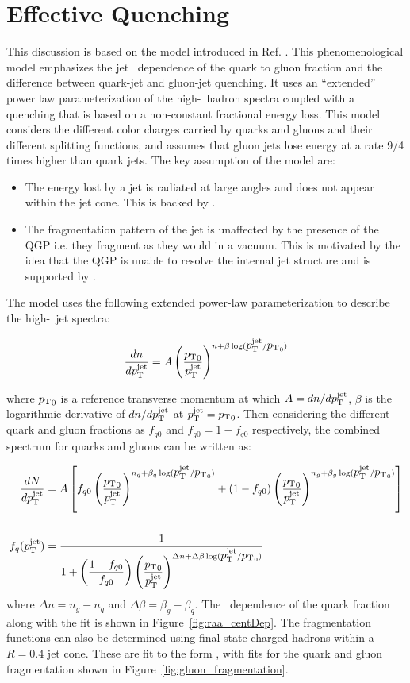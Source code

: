 \section{Effective Quenching}
This discussion is based on the model introduced in Ref. \cite{Spousta:2015fca}. This phenomenological model emphasizes the jet \pt\ dependence of the quark to gluon fraction and the difference between quark-jet and gluon-jet quenching. It uses an ``extended'' power law parameterization of the high-\pt\ hadron spectra coupled with a quenching that is based on a non-constant fractional energy loss. This model considers the different color charges carried by quarks and gluons and their different splitting functions, and assumes that gluon jets lose energy at a rate 9/4 times higher than quark jets. The key assumption of the model are:
\begin{itemize}
\item The energy lost by a jet is radiated at large angles and does not appear within the jet cone. This is backed by \cite{Chatrchyan:2011sx}.
\item The fragmentation pattern of the jet is unaffected by the presence of the QGP i.e. they fragment as they would in a vacuum. This is motivated by the idea that the QGP is unable to resolve the internal jet structure and is supported by \cite{Blaizot:2013hx, CasalderreySolana:2012ef}.
\end{itemize} 

The model uses the following extended power-law parameterization to describe the high-\pt\ jet spectra:

\begin{align}
\frac{dn}{d\mbox{$p_{\mathrm{T}}^{\mathrm{jet}}$}} = A \left( \frac{\mbox{$p_{\mathrm{T}}$}_0}{\mbox{$p_{\mathrm{T}}^{\mathrm{jet}}$}} \right) ^{n+\beta \log(\mbox{$p_{\mathrm{T}}^{\mathrm{jet}}$} / \mbox{$p_{\mathrm{T}}$}_0)}
\end{align}

where $\mbox{$p_{\mathrm{T}}$}_0$ is a reference transverse momentum at which $A= dn/d\mbox{$p_{\mathrm{T}}^{\mathrm{jet}}$}$, $\beta$ is the logarithmic derivative of $dn/d\mbox{$p_{\mathrm{T}}^{\mathrm{jet}}$}$ at $\mbox{$p_{\mathrm{T}}^{\mathrm{jet}}$} = \mbox{$p_{\mathrm{T}}$}_0$. Then considering the different quark and gluon fractions as $f_{q0}$ and $f_{g0} = 1-f_{q0}$ respectively, the combined spectrum for quarks and gluons can be written as:

\begin{align}
 \frac{dN}{d\mbox{$p_{\mathrm{T}}^{\mathrm{jet}}$}} &= A \left[ f_{q0} \left( \frac{\mbox{$p_{\mathrm{T}}$}_0}{\mbox{$p_{\mathrm{T}}^{\mathrm{jet}}$}} \right)^{n_q+ \beta_q \log(\mbox{$p_{\mathrm{T}}^{\mathrm{jet}}$} / \mbox{$p_{\mathrm{T}}$}_0)} + (1-f_{q0}) \left( \frac{\mbox{$p_{\mathrm{T}}$}_0}{\mbox{$p_{\mathrm{T}}^{\mathrm{jet}}$}} \right)^{n_g + \beta_g \log(\mbox{$p_{\mathrm{T}}^{\mathrm{jet}}$} / \mbox{$p_{\mathrm{T}}$}_0)} \right] \\
\nonumber \\ 
\label{eq:eq_q_frac} f_q (\mbox{$p_{\mathrm{T}}^{\mathrm{jet}}$}) &= \dfrac{1}{1 + \left(\dfrac{1-f_{q0}}{f_{q0}}\right) \left( \dfrac{\mbox{$p_{\mathrm{T}}$}_0}{\mbox{$p_{\mathrm{T}}^{\mathrm{jet}}$}}\right)^{\Delta n + \Delta \beta \log(\mbox{$p_{\mathrm{T}}^{\mathrm{jet}}$}/\mbox{$p_{\mathrm{T}}$}_0)} }
\end{align}
where $\Delta n = n_g - n_q$ and $\Delta \beta = \beta_g - \beta_q$. The \pt\ dependence of the quark fraction along with the fit is shown in Figure~\ref{fig:raa_centDep}. The fragmentation functions can also be determined using final-state charged hadrons within a $R=0.4$ jet cone. These are fit to the form \Dz, with fits for the quark and gluon fragmentation shown in Figure~\ref{fig:gluon_fragmentation}.


